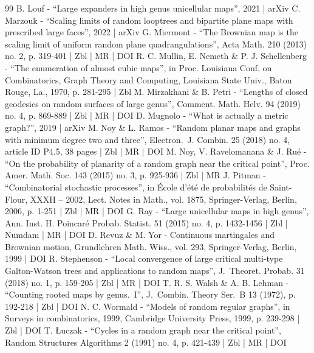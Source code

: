 \begin{thebibliography}{99}
B. Louf - “Large expanders in high genus unicellular maps”, 2021 | arXiv
C. Marzouk - “Scaling limits of random looptrees and bipartite plane maps with prescribed large faces”, 2022 | arXiv
G. Miermont - “The Brownian map is the scaling limit of uniform random plane quadrangulations”, Acta Math. 210 (2013) no. 2, p. 319-401 | Zbl | MR | DOI
R. C. Mullin, E. Nemeth \& P. J. Schellenberg - “The enumeration of almost cubic maps”, in Proc. Louisiana Conf. on Combinatorics, Graph Theory and Computing, Louisiana State Univ., Baton Rouge, La., 1970, p. 281-295 | Zbl
M. Mirzakhani \& B. Petri - “Lengths of closed geodesics on random surfaces of large genus”, Comment. Math. Helv. 94 (2019) no. 4, p. 869-889 | Zbl | MR | DOI
D. Mugnolo - “What is actually a metric graph?”, 2019 | arXiv
M. Noy \& L. Ramos - “Random planar maps and graphs with minimum degree two and three”, Electron. J. Combin. 25 (2018) no. 4, article ID P4.5, 38 pages | Zbl | MR | DOI
M. Noy, V. Ravelomanana \& J. Rué - “On the probability of planarity of a random graph near the critical point”, Proc. Amer. Math. Soc. 143 (2015) no. 3, p. 925-936 | Zbl | MR
J. Pitman - “Combinatorial stochastic processes”, in École d’été de probabilités de Saint-Flour, XXXII – 2002, Lect. Notes in Math., vol. 1875, Springer-Verlag, Berlin, 2006, p. 1-251 | Zbl | MR | DOI
G. Ray - “Large unicellular maps in high genus”, Ann. Inst. H. Poincaré Probab. Statist. 51 (2015) no. 4, p. 1432-1456 | Zbl | Numdam | MR | DOI
D. Revuz \& M. Yor - Continuous martingales and Brownian motion, Grundlehren Math. Wiss., vol. 293, Springer-Verlag, Berlin, 1999 | DOI
R. Stephenson - “Local convergence of large critical multi-type Galton-Watson trees and applications to random maps”, J. Theoret. Probab. 31 (2018) no. 1, p. 159-205 | Zbl | MR | DOI
T. R. S. Walsh \& A. B. Lehman - “Counting rooted maps by genus. I”, J. Combin. Theory Ser. B 13 (1972), p. 192-218 | Zbl | DOI
N. C. Wormald - “Models of random regular graphs”, in Surveys in combinatorics, 1999, Cambridge University Press, 1999, p. 239-298 | Zbl | DOI
T. Łuczak - “Cycles in a random graph near the critical point”, Random Structures Algorithms 2 (1991) no. 4, p. 421-439 | Zbl | MR | DOI
\end{thebibliography}

